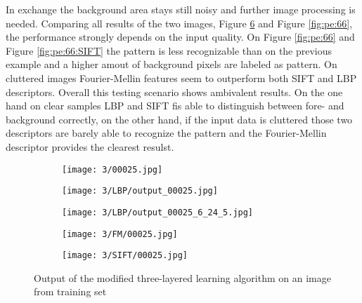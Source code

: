 \documentclass[draft,final]{vutinfth} %
\begin{document}
In exchange the background area stays still noisy and further image processing is needed.
Comparing all results of the two images, Figure \ref{fig:pe:25} and Figure \ref{fig:pe:66}, the performance strongly depends on the input quality.
On Figure \ref{fig:pe:66} and Figure \ref{fig:pe:66:SIFT} the pattern is less recognizable than on the previous example and a higher amout of background pixels are labeled as pattern.
On cluttered images Fourier-Mellin features seem to outperform both SIFT and LBP descriptors.
Overall this testing scenario shows ambivalent results.
On the one hand on clear samples LBP and SIFT fis able to distinguish between fore- and background correctly, on the other hand, if the input data is cluttered those two descriptors are barely able to recognize the pattern and the Fourier-Mellin descriptor provides the clearest resulst. 

\begin{figure}[h]
  \centering
  \begin{subfigure}[b]{0.19\columnwidth}
    \centering
    \texttt{[image: 3/00025.jpg]}
    \label{fig:pe:25:orig}
  \end{subfigure}
  \begin{subfigure}[b]{0.19\columnwidth}
    \centering
    \texttt{[image: 3/LBP/output\_00025.jpg]}
    \label{fig:pe:25:LBPs}
  \end{subfigure}
  \begin{subfigure}[b]{0.19\columnwidth}
    \centering
    \texttt{[image: 3/LBP/output\_00025\_6\_24\_5.jpg]}
    \label{fig:pe:25:LBPb}
  \end{subfigure}
  \begin{subfigure}[b]{0.19\columnwidth}
    \centering
    \texttt{[image: 3/FM/00025.jpg]}
    \label{fig:pe:25:FM}
  \end{subfigure}
  \begin{subfigure}[b]{0.19\columnwidth}
    \centering
    \texttt{[image: 3/SIFT/00025.jpg]}
    \label{fig:pe:25:SIFT}
  \end{subfigure}
  \caption{Output of the modified three-layered learning algorithm on an image from training set}
  \label{fig:pe:25}
\end{figure}
\end{document}
